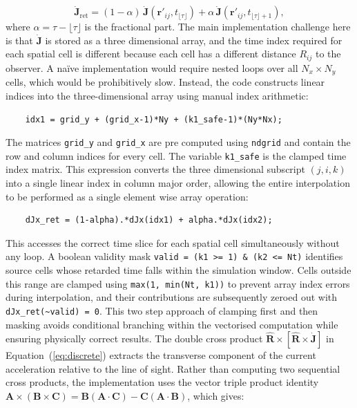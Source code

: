 \documentclass[12pt]{final_project_report}
\begin{document}
\begin{equation}
    \dot{\mathbf{J}}_{\mathrm{ret}} = (1 - \alpha)\,\dot{\mathbf{J}}(\mathbf{r}'_{ij}, t_{\lfloor\tau\rfloor}) + \alpha\,\dot{\mathbf{J}}(\mathbf{r}'_{ij}, t_{\lfloor\tau\rfloor+1}),
\end{equation}
where $\alpha = \tau - \lfloor\tau\rfloor$ is the fractional part. The main implementation challenge here is that $\dot{\mathbf{J}}$ is stored as a three dimensional array, and the time index required for each spatial cell is different because each cell has a different distance $R_{ij}$ to the observer. A na\"ive implementation would require nested loops over all $N_x \times N_y$ cells, which would be prohibitively slow. Instead, the code constructs linear indices into the three-dimensional array using manual index arithmetic:
\begin{verbatim}
    idx1 = grid_y + (grid_x-1)*Ny + (k1_safe-1)*(Ny*Nx);
\end{verbatim}
The matrices \texttt{grid\_y} and \texttt{grid\_x} are pre computed using \texttt{ndgrid} and contain the row and column indices for every cell. The variable \texttt{k1\_safe} is the clamped time index matrix. This expression converts the three dimensional subscript $(j, i, k)$ into a single linear index in column major order, allowing the entire interpolation to be performed as a single element wise array operation:
\begin{verbatim}
    dJx_ret = (1-alpha).*dJx(idx1) + alpha.*dJx(idx2);
\end{verbatim}
This accesses the correct time slice for each spatial cell simultaneously without any loop.\newline
A boolean validity mask \texttt{valid = (k1 >= 1) \& (k2 <= Nt)} identifies source cells whose retarded time falls within the simulation window. Cells outside this range are clamped using \texttt{max(1, min(Nt, k1))} to prevent array index errors during interpolation, and their contributions are subsequently zeroed out with \texttt{dJx\_ret(\textasciitilde valid) = 0}. This two step approach of clamping first and then masking avoids conditional branching within the vectorised computation while ensuring physically correct results.\newline
The double cross product $\hat{\mathbf{R}} \times [\hat{\mathbf{R}} \times \dot{\mathbf{J}}]$ in Equation~(\ref{eq:discrete}) extracts the transverse component of the current acceleration relative to the line of sight. Rather than computing two sequential cross products, the implementation uses the vector triple product identity $\mathbf{A} \times (\mathbf{B} \times \mathbf{C}) = \mathbf{B}(\mathbf{A} \cdot \mathbf{C}) - \mathbf{C}(\mathbf{A} \cdot \mathbf{B})$, which gives:
\end{document}
